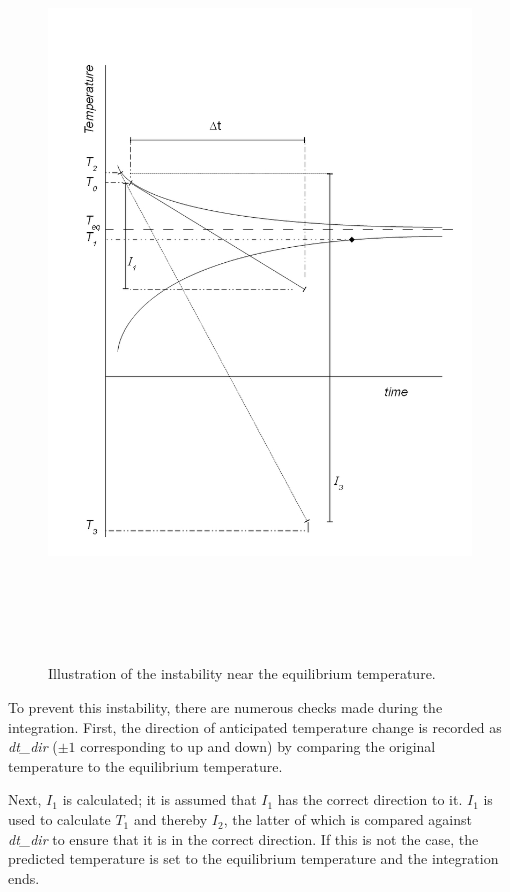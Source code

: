 \begin{figure}[htp]
\begin{center}
\includegraphics[height=200mm]{figures/temp_integ1.jpg}
\caption{Illustration of the instability near the equilibrium temperature.}
\label{fig:tempasymptote1}
\end{center}
\end{figure}

To prevent this instability, there are numerous checks made during the integration.  First, the direction of anticipated temperature change is recorded as \textit{dt\_dir} ($\pm 1$ corresponding to up and down) by comparing the original temperature to the equilibrium temperature.

Next, $I_1$ is calculated; it is assumed that $I_1$ has the correct direction to it.  $I_1$ is used to calculate $T_1$ and thereby $I_2$, the latter of which is compared against \textit{dt\_dir} to ensure that it is in the correct direction.  If this is not the case, the predicted temperature is set to the equilibrium temperature and the integration ends.

